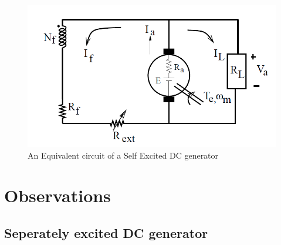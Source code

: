 \documentclass[12pt]{article}
\begin{document}
                \begin{figure}[H]
                    \centering
                    \includegraphics[width = 0.8\linewidth]{LAB-3/shunt_equi_cir.PNG}
                    \caption{An Equivalent circuit of a Self Excited DC generator}
                    \label{fig:my_label}
                \end{figure}
            
    \newpage
    
    \section{Observations}
    \subsection{Seperately excited DC generator}
\end{document}
